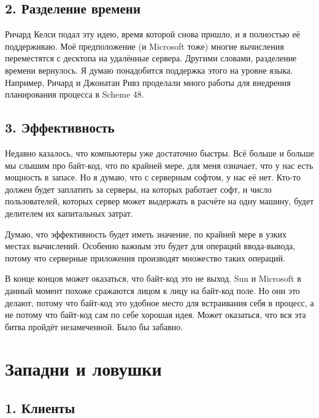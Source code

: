 \documentclass[ebook,12pt,oneside,openany]{memoir}
\begin{document}
\subsection{2. Разделение времени}

Ричард Келси подал эту идею, время которой снова пришло, и я полностью
её поддерживаю. Моё предположение (и Microsoft тоже) многие вычисления
переместятся с десктопа на удалённые сервера. Другими словами,
разделение времени вернулось. Я думаю понадобится поддержка этого на
уровне языка. Например, Ричард и Джонатан Ривз проделали много работы
для внедрения планирования процесса в Scheme 48. \newline

\subsection{3. Эффективность}

Недавно казалось, что компьютеры уже достаточно быстры. Всё больше и
больше мы слышим про байт-код, что по крайней мере, для меня означает,
что у нас есть мощность в запасе. Но я думаю, что с серверным софтом,
у нас её нет. Кто-то должен будет заплатить за серверы, на которых
работает софт, и число пользователей, которых сервер может выдержать в
расчёте на одну машину, будет делителем их капитальных затрат. \newline

Думаю, что эффективность будет иметь значение, по крайней мере в узких
местах вычислений. Особенно важным это будет для операций
ввода-вывода, потому что серверные приложения производят множество
таких операций. \newline

В конце концов может оказаться, что байт-код это не выход. Sun и
Microsoft в данный момент похоже сражаются лицом к лицу на байт-код
поле. Но они это делают, потому что байт-код это удобное место для
встраивания себя в процесс, а не потому что байт-код сам по себе
хорошая идея. Может оказаться, что вся эта битва пройдёт незамеченной.
Было бы забавно. \newline

\section*{Западни и ловушки}

\subsection{1. Клиенты}
\end{document}

